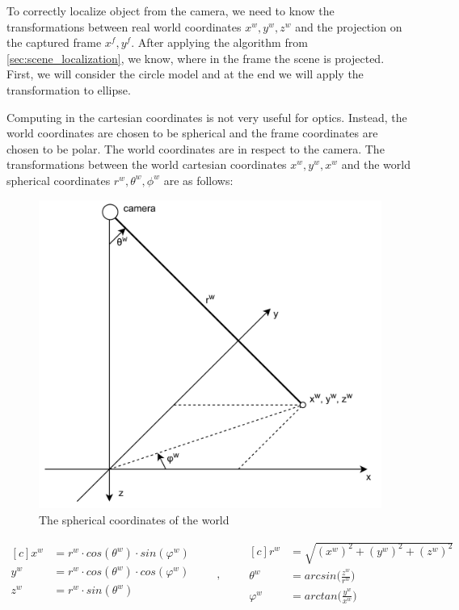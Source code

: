\documentclass[a4paper,12pt,titlepage, twoside]{article}
\numberwithin{figure}{section}
\begin{document}
To correctly localize object from the camera, we need to know the transformations between real world coordinates $x^w, y^w, z^w$ and the projection on the captured frame $x^f, y^f$. After applying the algorithm from \ref{sec:scene_localization}, we know, where in the frame the scene is projected. First, we will consider the circle model and at the end we will apply the transformation to ellipse. 

Computing in the cartesian coordinates is not very useful for optics. Instead, the world coordinates are chosen to be spherical and the frame coordinates are chosen to be polar. The world coordinates are in respect to the camera. 
The transformations between the world cartesian coordinates $x^w, y^w, x^w$ and the world spherical coordinates $r^w, \theta^w, \phi^w$ are as follows:

\begin{figure}[h]
\centering
\includegraphics[width=1\linewidth]{fig/sphere.png}
\caption{The spherical coordinates of the world}
\label{fig:sphere}
\end{figure}


\begin{equation*}
\begin{aligned}[c]
x^w &= r^w \cdot cos(\theta^w) \cdot sin(\varphi^w) \\
y^w &= r^w \cdot cos(\theta^w) \cdot cos(\varphi^w) \\
z^w &= r^w \cdot sin(\theta^w) \\
\end{aligned}
\qquad,\qquad
\begin{aligned}[c]
r^w &= \sqrt{(x^w)^2 + (y^w)^2 + (z^w)^2} \\
\theta^w &= arcsin\Big(\frac{z^w}{r^w}\Big) \\
\varphi^w &= arctan\Big(\frac{y^w}{x^w}\Big) \\
\end{aligned}
\end{equation*}
\end{document}
